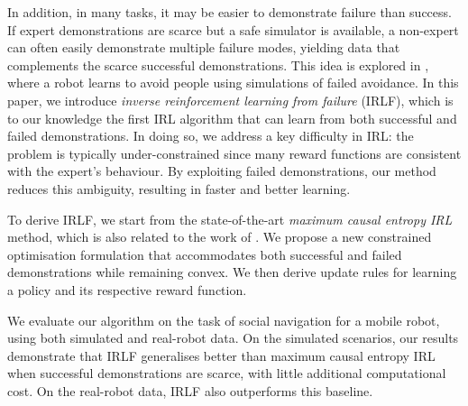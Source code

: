 \documentclass{aamas2016}
\newcommand{\jm}[1]{\textcolor{blue}{Joao: #1}}
\newcommand{\jm}[1]{}
\begin{document}
In addition, in many tasks, it may be easier to demonstrate failure than success.  If expert demonstrations are scarce but a safe simulator is available, a non-expert can often easily demonstrate multiple failure modes, yielding data that complements the scarce successful demonstrations. This idea is explored in \cite{choi2015}, where a robot learns to avoid people using simulations of failed avoidance.
In this paper, we introduce \emph{inverse reinforcement learning from failure} (IRLF), which is to our knowledge the first IRL algorithm that can learn from both successful and failed demonstrations. In doing so, we address a key difficulty in IRL: the problem is typically under-constrained since many reward functions are consistent with the expert's behaviour.  By exploiting failed demonstrations, our method reduces this ambiguity, resulting in faster and better learning.

To derive IRLF, we start from the state-of-the-art \emph{maximum causal entropy IRL} \cite{ziebart2008maximum,ziebart2010modelingthesis} method, which is also related to the work of \cite{babes2011apprenticeship}. We propose a new constrained optimisation formulation that accommodates both successful and failed demonstrations while remaining convex.  We then derive update rules for learning a policy and its respective reward function.

We evaluate our algorithm on the task of social navigation for a mobile robot, using both simulated and real-robot data. On the simulated scenarios, our results demonstrate that IRLF generalises better than maximum causal entropy IRL when successful demonstrations are scarce, with little additional computational cost.  On the real-robot data, IRLF also outperforms this baseline. 

\end{document}
